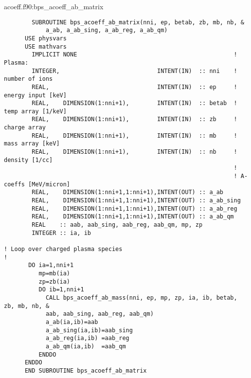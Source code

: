 \documentclass[preprint,12pt,eqsecnum,nofootinbib,amsmath,amssymb]{revtex4}
\begin{document}
\vskip0.4cm 
\noindent
acoeff.f90:bps\_acoeff\_ab\_matrix
{
\baselineskip 10pt
\begin{verbatim}
        SUBROUTINE bps_acoeff_ab_matrix(nni, ep, betab, zb, mb, nb, &
            a_ab, a_ab_sing, a_ab_reg, a_ab_qm)
      USE physvars
      USE mathvars    
        IMPLICIT NONE                                             ! Plasma:
        INTEGER,                            INTENT(IN)  :: nni    !  number of ions
        REAL,                               INTENT(IN)  :: ep     !  energy input [keV]
        REAL,    DIMENSION(1:nni+1),        INTENT(IN)  :: betab  !  temp array [1/keV]
        REAL,    DIMENSION(1:nni+1),        INTENT(IN)  :: zb     !  charge array
        REAL,    DIMENSION(1:nni+1),        INTENT(IN)  :: mb     !  mass array [keV]
        REAL,    DIMENSION(1:nni+1),        INTENT(IN)  :: nb     !  density [1/cc]
                                                                  !
                                                                  ! A-coeffs [MeV/micron]
        REAL,    DIMENSION(1:nni+1,1:nni+1),INTENT(OUT) :: a_ab
        REAL,    DIMENSION(1:nni+1,1:nni+1),INTENT(OUT) :: a_ab_sing
        REAL,    DIMENSION(1:nni+1,1:nni+1),INTENT(OUT) :: a_ab_reg
        REAL,    DIMENSION(1:nni+1,1:nni+1),INTENT(OUT) :: a_ab_qm
        REAL    :: aab, aab_sing, aab_reg, aab_qm, mp, zp
        INTEGER :: ia, ib

! Loop over charged plasma species
!
       DO ia=1,nni+1
          mp=mb(ia)
          zp=zb(ia)
          DO ib=1,nni+1
            CALL bps_acoeff_ab_mass(nni, ep, mp, zp, ia, ib, betab, zb, mb, nb, &
            aab, aab_sing, aab_reg, aab_qm)
            a_ab(ia,ib)=aab
            a_ab_sing(ia,ib)=aab_sing
            a_ab_reg(ia,ib) =aab_reg
            a_ab_qm(ia,ib)  =aab_qm   
          ENDDO
      ENDDO
      END SUBROUTINE bps_acoeff_ab_matrix
\end{verbatim}

}
\end{document}
